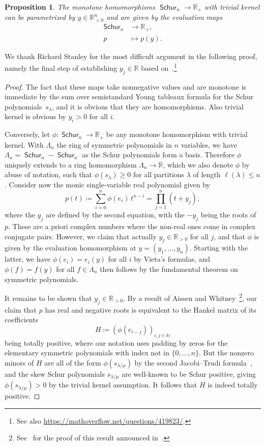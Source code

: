 \documentclass[11pt]{article}
\newtheorem{prop}[theo]{Proposition}
\theoremstyle{definition}
\numberwithin{equation}{section}
\newcommand{\N}{\mathbb{N}}
\newcommand{\R}{\mathbb{R}}
\DeclareMathOperator{\Schur}{\mathsf{Schur}}
\begin{document}
\begin{prop}
	\label{real_schur}
	The monotone homomorphisms $\Schur_n \to \R_+$ with trivial kernel can be parametrized by $y \in \R^n_{>0}$ and are given by the evaluation maps
	\begin{align*}
		\Schur_n & \longrightarrow \R_+, \\
		p & \longmapsto p(y).
	\end{align*}
\end{prop}

We thank Richard Stanley for the most difficult argument in the following proof, namely the final step of establishing $y_j \in \R$ based on~\cite{totallypositive}.\footnote{See also \url{https://mathoverflow.net/questions/419823/}.}

\begin{proof}
	The fact that these maps take nonnegative values and are monotone is immediate by the sum over semistandard Young tableaux formula for the Schur polynomials~$s_\lambda$, and it is obvious that they are homomorphisms. Also trivial kernel is obvious by $y_i > 0$ for all $i$.

	Conversely, let $\phi : \Schur_n \to \R_+$ be any monotone homomorphism with trivial kernel.
	With $\Lambda_n$ the ring of symmetric polynomials in $n$ variables, we have $\Lambda_n = \Schur_n - \Schur_n$ as the Schur polynomials form a basis.
	Therefore $\phi$ uniquely extends to a ring homomorphism $\Lambda_n \to \R$, which we also denote $\phi$ by abuse of notation, such that $\phi(s_\lambda) \ge 0$ for all partitions $\lambda$ of length $\ell(\lambda) \le n$.
	Consider now the monic single-variable real polynomial given by
	\[
		p(t) \coloneqq \sum_{i=0}^n \phi(e_i) \, t^{n-i} = \prod_{j=1}^n (t + y_j),
	\]
	where the $y_j$ are defined by the second equation, with the $-y_j$ being the roots of~$p$.
	These are a priori complex numbers where the non-real ones come in complex conjugate pairs.
	However, we claim that actually $y_j \in \R_{>0}$ for all $j$, and that $\phi$ is given by the evaluation homomorphism at $y = (y_1,\ldots,y_n)$.
	Starting with the latter, we have $\phi(e_i) = e_i(y)$ for all $i$ by Vieta's formulas, and $\phi(f) = f(y)$ for all $f \in \Lambda_n$ then follows by the fundamental theorem on symmetric polynomials.

	It remains to be shown that $y_j \in \R_{>0}$.
	By a result of Aissen and Whitney~\cite[6.]{totallypositive}\footnote{See~\cite{totallypositiveI} for the proof of this result announced in~\cite{totallypositive}.}, our claim that $p$ has real and negative roots is equivalent to the Hankel matrix of its coefficients
	\[
		H \coloneqq \left( \phi(e_{i-j}) \right)_{i,j \in \N}
	\]
	being totally positive, where our notation uses padding by zeros for the elementary symmetric polynomials with index not in $\{0,\ldots,n\}$.
	But the nonzero minors of $H$ are all of the form $\phi(s_{\lambda / \mu})$ by the second Jacobi--Trudi formula~\cite[Corollary~7.16.2]{stanley2}, and the skew Schur polynomials $s_{\lambda / \mu}$ are well-known to be Schur positive, giving $\phi(s_{\lambda / \mu}) > 0$ by the trivial kernel assumption. It follows that $H$ is indeed totally positive.
\end{proof}
\end{document}
